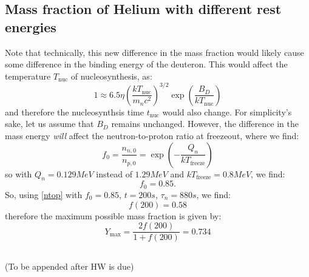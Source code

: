 \subsection{Mass fraction of Helium with different rest energies}
Note that technically, this new difference in the mass fraction would likely cause some difference in the binding energy of the deuteron. This would affect the temperature $T_{\text{nuc}}$ of nucleosynthesis, as:
\begin{equation}
    1 \approx 6.5\eta\left(\frac{kT_{\text{nuc}}}{m_n c^2}\right)^{3/2}\exp(\frac{B_{D}}{kT_{\text{nuc}}})
\end{equation}
and therefore the nucleosynthsis time $t_{\text{nuc}}$ would also change. For simplicity's sake, let us assume that $B_D$ remains unchanged. However, the difference in the mass energy \emph{will} affect the neutron-to-proton ratio at freezeout, where we find:
\begin{equation}
    f_0 = \frac{n_{n, 0}}{n_{p, 0}} = \exp(-\frac{Q_{n}}{kT_{\text{freeze}}})
\end{equation}
so with $Q_{n} = 0.129\si{MeV}$ instead of $1.29\si{MeV}$ and $kT_{\text{freeze}} = 0.8\si{MeV}$, we find:
\begin{equation}
    f_0 = 0.85.
\end{equation}
So, using \eqref{ntop} with $f_0 = 0.85$, $t = 200\si{s}$, $\tau_n = 880\si{s}$, we find:
\begin{equation}
    f(200) = 0.58
\end{equation}
therefore the maximum possible mass fraction is given by:
\begin{equation}
    \boxed{Y_{\text{max}} = \frac{2f(200)}{1 + f(200)} = 0.734}
\end{equation}


\subsection{}
(To be appended after HW is due)

